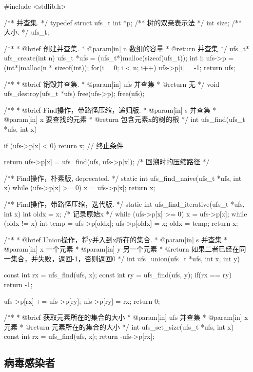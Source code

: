 \begin{Codex}[label=ufs.c]
#include <stdlib.h>

/** 并查集. */
typedef struct ufs_t {
    int *p;     /** 树的双亲表示法 */
    int size;   /** 大小. */
} ufs_t;

/**
 * @brief 创建并查集.
 * @param[in] n 数组的容量
 * @return 并查集
 */
ufs_t* ufs_create(int n) {
    ufs_t *ufs = (ufs_t*)malloc(sizeof(ufs_t));
    int i;
    ufs->p = (int*)malloc(n * sizeof(int));
    for(i = 0; i < n; i++)
        ufs->p[i] = -1;
    return ufs;
}

/**
 * @brief 销毁并查集.
 * @param[in] ufs 并查集
 * @return 无
 */
void ufs_destroy(ufs_t *ufs) {
    free(ufs->p);
    free(ufs);
}

/**
 * @brief Find操作，带路径压缩，递归版.
 * @param[in] s 并查集
 * @param[in] x 要查找的元素
 * @return 包含元素x的树的根
 */
int ufs_find(ufs_t *ufs, int x) {
    if (ufs->p[x] < 0) return x; // 终止条件

    return ufs->p[x] = ufs_find(ufs, ufs->p[x]); /* 回溯时的压缩路径 */
}

/** Find操作，朴素版, deprecated. */
static int ufs_find_naive(ufs_t *ufs, int x) {
    while (ufs->p[x] >= 0) {
        x = ufs->p[x];
    }
    return x;
}

/** Find操作，带路径压缩，迭代版. */
static int ufs_find_iterative(ufs_t *ufs, int x) {
    int oldx = x; /* 记录原始x */
    while (ufs->p[x] >= 0) {
        x = ufs->p[x];
    }
    while (oldx != x) {
        int temp = ufs->p[oldx];
        ufs->p[oldx] = x;
        oldx = temp;
    }
    return x;
}

/**
 * @brief Union操作，将y并入到x所在的集合.
 * @param[in] s 并查集
 * @param[in] x 一个元素
 * @param[in] y 另一个元素
 * @return 如果二者已经在同一集合，并失败，返回-1，否则返回0
 */
int ufs_union(ufs_t *ufs, int x, int y) {
    const int rx = ufs_find(ufs, x);
    const int ry = ufs_find(ufs, y);
    if(rx == ry) return -1;

    ufs->p[rx] += ufs->p[ry];
    ufs->p[ry] = rx;
    return 0;
}

/**
 * @brief 获取元素所在的集合的大小
 * @param[in] ufs 并查集
 * @param[in] x 元素
 * @return 元素所在的集合的大小
 */
int ufs_set_size(ufs_t *ufs, int x) {
    const int rx = ufs_find(ufs, x);
    return -ufs->p[rx];
}
\end{Codex}


\subsection{病毒感染者} %
